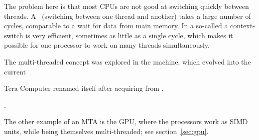 The problem here is that most CPUs are not good
at switching quickly between threads. A~
(switching between one thread and another) takes a large number of
cycles, comparable to a wait for data from main memory. In a so-called
 a context-switch is very efficient, sometimes as little
as a single
cycle, which makes it possible for one processor to work on many
threads simultaneously.

The multi-threaded concept was explored in the  machine, which evolved into the current
\begin{footnoteenv}
{Tera Computer renamed itself
   after acquiring  from
  .}
  \end{footnoteenv}%
  .

The other example of an \ac{MTA} is the \ac{GPU}, where the processors
work as \ac{SIMD} units, while being themselves multi-threaded; see
section~\ref{sec:gpu}.
